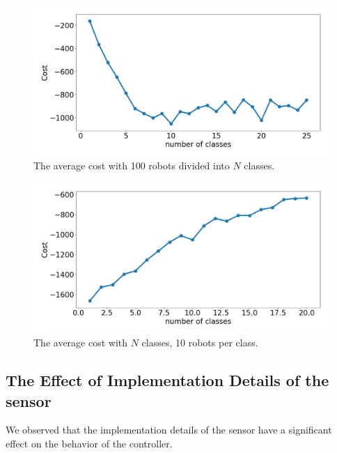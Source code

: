 \documentclass[conference]{IEEEtran}
\begin{document}
\begin{figure}[t]
  \centering
  \includegraphics[width=1\linewidth]{./images/num_classes_vs_cost_100_robots.png}
  \caption{The average cost with 100 robots divided into $N$ classes.}
  \label{fig:num_classes_100}
\end{figure}

\begin{figure}[t]
  \centering
  \includegraphics[width=1\linewidth]{./images/num_classes_vs_cost_10_per_class.png}
  \caption{The average cost with $N$ classes, 10 robots per class.}
  \label{fig:num_classes_10}
\end{figure}

\subsection{The Effect of Implementation Details of the sensor} \label{section:sensor_impl}

We observed that the implementation details of the sensor have a significant
effect on the behavior of the controller.
\end{document}
